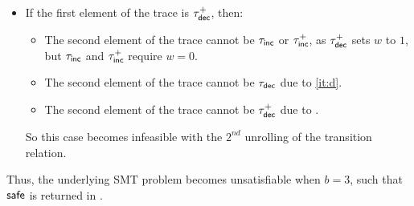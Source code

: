 {\begin{itemize}
\begin{itemize}
          \item The second element of the trace cannot be $\tau^+_\inc$ due to .
          \item If the second element of the trace is $\tau^+_\dec$, then:
                \begin{itemize}
                  \item The third element of the trace cannot be $\tau_\inc$ or $\tau^+_\inc$, as $\tau^+_\dec$ sets $w$ to $1$, but $\tau_\inc$ and $\tau^+_\inc$ require $w = 0$.
                  \item The third element of the trace cannot be $\tau_\dec$ due to \eqref{it:e}.
                  \item The third element of the trace cannot be $\tau^+_\dec$ due to .
                \end{itemize}
        \end{itemize}
        So this case becomes infeasible with the $3^{rd}$ unrolling of the transition relation.
  \item If the first element of the trace is $\tau^+_\dec$, then:
        \begin{itemize}
          \item The second element of the trace cannot be $\tau_\inc$ or $\tau^+_\inc$, as $\tau^+_\dec$ sets $w$ to $1$, but $\tau_\inc$ and $\tau^+_\inc$ require $w = 0$.
          \item The second element of the trace cannot be $\tau_\dec$ due to \eqref{it:d}.
          \item The second element of the trace cannot be $\tau^+_\dec$ due to .
        \end{itemize}
        So this case becomes infeasible with the $2^{nd}$ unrolling of the transition relation.
\end{itemize}
Thus, the underlying SMT problem becomes unsatisfiable when $b=3$, such that $\mathsf{safe}$ is returned in .
}
